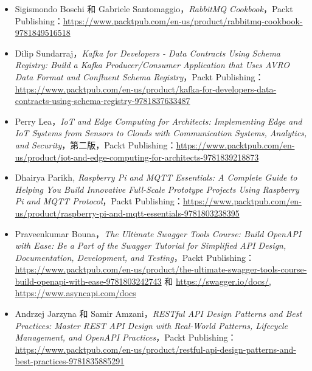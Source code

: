 \begin{itemize}
\item Sigismondo Boschi 和 Gabriele Santomaggio，\emph{RabbitMQ Cookbook}，Packt Publishing：\href{https://www.packtpub.com/en-us/product/rabbitmq-cookbook-9781849516518}{https://www.packtpub.com/en-us/product/rabbitmq-cookbook-9781849516518}
\item Dilip Sundarraj，\emph{Kafka for Developers - Data Contracts Using Schema Registry: Build a Kafka Producer/Consumer Application that Uses AVRO Data Format and Confluent Schema Registry}，Packt Publishing：\href{https://www.packtpub.com/en-us/product/kafka-for-developers-data-contracts-using-schema-registry-9781837633487}{https://www.packtpub.com/en-us/product/kafka-for-developers-data-contracts-using-schema-registry-9781837633487}
\item Perry Lea，\emph{IoT and Edge Computing for Architects: Implementing Edge and IoT Systems from Sensors to Clouds with Communication Systems, Analytics, and Security}，第二版，Packt Publishing：\href{https://www.packtpub.com/en-us/product/iot-and-edge-computing-for-architects-9781839218873}{https://www.packtpub.com/en-us/product/iot-and-edge-computing-for-architects-9781839218873}
\item Dhairya Parikh\emph{, Raspberry Pi and MQTT Essentials: A Complete Guide to Helping You Build Innovative Full-Scale Prototype Projects Using Raspberry Pi and MQTT Protocol}，Packt Publishing：\href{https://www.packtpub.com/en-us/product/raspberry-pi-and-mqtt-essentials-9781803238395}{https://www.packtpub.com/en-us/product/raspberry-pi-and-mqtt-essentials-9781803238395}
\item Praveenkumar Bouna，\emph{The Ultimate Swagger Tools Course: Build OpenAPI with Ease: Be a Part of the Swagger Tutorial for Simplified API Design, Documentation, Development, and Testing}，Packt Publishing：\href{https://www.packtpub.com/en-us/product/the-ultimate-swagger-tools-course-build-openapi-with-ease-9781803242743}{https://www.packtpub.com/en-us/product/the-ultimate-swagger-tools-course-build-openapi-with-ease-9781803242743} 和 \href{https://swagger.io/docs/,}{https://swagger.io/docs/,} \href{https://www.asyncapi.com/docs}{https://www.asyncapi.com/docs}
\item Andrzej Jarzyna 和 Samir Amzani，\emph{RESTful API Design Patterns and Best Practices: Master REST API Design with Real-World Patterns, Lifecycle Management, and OpenAPI Practices}，Packt Publishing：\href{https://www.packtpub.com/en-us/product/restful-api-design-patterns-and-best-practices-9781835885291}{https://www.packtpub.com/en-us/product/restful-api-design-patterns-and-best-practices-9781835885291}

\end{itemize}
